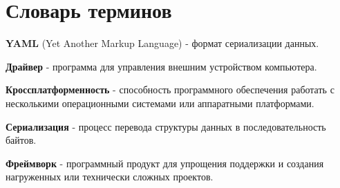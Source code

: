 \chapter*{\centering Словарь терминов}                       %

\textbf{YAML} (Yet Another Markup Language) - формат сериализации данных.

\textbf{Драйвер} - программа для управления внешним устройством компьютера.

\textbf{Кроссплатформенность} - способность программного обеспечения работать с несколькими операционными системами или аппаратными платформами.

\textbf{Сериализация} - процесс перевода структуры данных в последовательность байтов.

\textbf{Фреймворк} - программный продукт для упрощения поддержки и создания нагруженных или технически сложных проектов.

